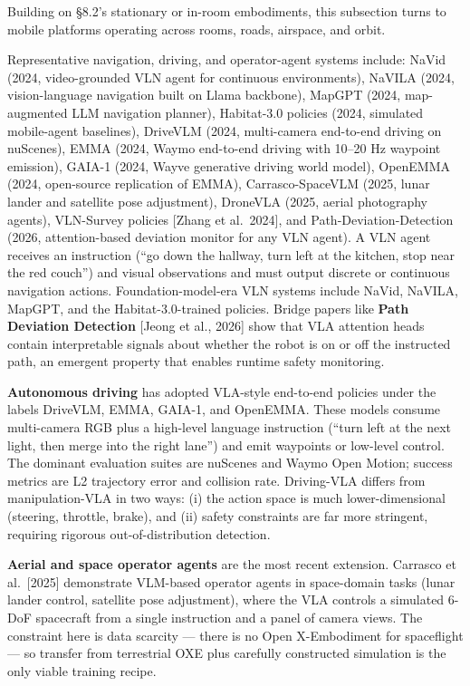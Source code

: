 Building on §8.2's stationary or in-room embodiments, this subsection turns to mobile platforms operating across rooms, roads, airspace, and orbit.

Representative navigation, driving, and operator-agent systems include: NaVid (2024, video-grounded VLN agent for continuous environments), NaVILA (2024, vision-language navigation built on Llama backbone), MapGPT (2024, map-augmented LLM navigation planner), Habitat-3.0 policies (2024, simulated mobile-agent baselines), DriveVLM (2024, multi-camera end-to-end driving on nuScenes), EMMA (2024, Waymo end-to-end driving with 10--20 Hz waypoint emission), GAIA-1 (2024, Wayve generative driving world model), OpenEMMA (2024, open-source replication of EMMA), Carrasco-SpaceVLM (2025, lunar lander and satellite pose adjustment), DroneVLA (2025, aerial photography agents), VLN-Survey policies {[}Zhang et al.~2024{]}, and Path-Deviation-Detection (2026, attention-based deviation monitor for any VLN agent). A VLN agent receives an instruction (``go down the hallway, turn left at the kitchen, stop near the red couch'') and visual observations and must output discrete or continuous navigation actions. Foundation-model-era VLN systems include NaVid, NaVILA, MapGPT, and the Habitat-3.0-trained policies. Bridge papers like \textbf{Path Deviation Detection} {[}Jeong et al., 2026{]} show that VLA attention heads contain interpretable signals about whether the robot is on or off the instructed path, an emergent property that enables runtime safety monitoring.

\textbf{Autonomous driving} has adopted VLA-style end-to-end policies under the labels DriveVLM, EMMA, GAIA-1, and OpenEMMA. These models consume multi-camera RGB plus a high-level language instruction (``turn left at the next light, then merge into the right lane'') and emit waypoints or low-level control. The dominant evaluation suites are nuScenes and Waymo Open Motion; success metrics are L2 trajectory error and collision rate. Driving-VLA differs from manipulation-VLA in two ways: (i) the action space is much lower-dimensional (steering, throttle, brake), and (ii) safety constraints are far more stringent, requiring rigorous out-of-distribution detection.

\textbf{Aerial and space operator agents} are the most recent extension. Carrasco et al.~{[}2025{]} demonstrate VLM-based operator agents in space-domain tasks (lunar lander control, satellite pose adjustment), where the VLA controls a simulated 6-DoF spacecraft from a single instruction and a panel of camera views. The constraint here is data scarcity --- there is no Open X-Embodiment for spaceflight --- so transfer from terrestrial OXE plus carefully constructed simulation is the only viable training recipe.

